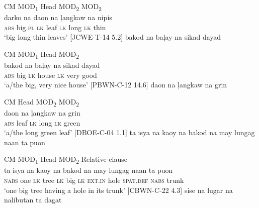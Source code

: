 CM  MOD\textsubscript{1} \hspace{10pt}   Head \hspace{8pt}   MOD\textsubscript{2} \hspace{18pt}   MOD\textsubscript{2} \\
\gll \emptyset{}  darko  na  daon  na  ļangkaw  na  nipis \\
\textsc{abs}  big.\textsc{pl}  \textsc{lk}  leaf  \textsc{lk}  long  \textsc{lk}  thin \\
\glt ‘big long thin leaves’ [JCWE-T-14 5.2]
\z
\ea
bakod  na  baļay  na  sikad  dayad \\\smallskip

CM  MOD\textsubscript{1} \hspace{9pt}   Head \hspace{13pt}   MOD\textsubscript{2} \\
\gll \emptyset{}  bakod  na  baļay  na  sikad  dayad \\
\textsc{abs}  big  \textsc{lk}  house  \textsc{lk}  very  good \\
\glt ‘a/the big, very nice house’ [PBWN-C-12 14.6]
\z
\ea
\emptyset{}  daon  na  ļangkaw  na  grin \\\smallskip

CM  Head \hspace{8pt}   MOD\textsubscript{2} \hspace{18pt}   MOD\textsubscript{2} \\
\gll \emptyset{}  daon  na  ļangkaw  na  grin \\
\textsc{abs} leaf  \textsc{lk}  long  \textsc{lk}  green \\
\glt ‘a/the long green leaf’ [DBOE-C-04 1.1]
\z
\ea
ta  isya  na  kaoy  na  bakod  na  may  lungag  naan  ta  puon \\\smallskip

CM \hspace{4pt} MOD\textsubscript{1} \hspace{2pt}   Head \hspace{6pt}   MOD\textsubscript{2} \hspace{8pt} Relative clause \\
\gll ta  isya  na  kaoy  na  bakod  na  may  lungag  naan  ta  puon \\
\textsc{nabs}  one  \textsc{lk}  tree  \textsc{lk}  big  \textsc{lk}  \textsc{ext.in}  hole  \textsc{spat.def}  \textsc{nabs}  trunk \\
\glt ‘one big tree having a hole in its trunk’ [CBWN-C-22 4.3]
\z
\ea
\label{bkm:Ref447702340}
\emptyset{}  sise  na  lugar  na  nalibutan  ta  dagat \\\smallskip

